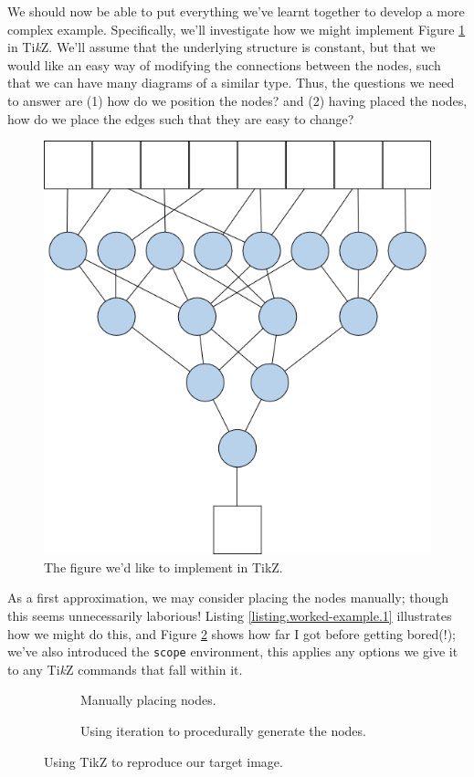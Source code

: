 We should now be able to put everything we've learnt together to develop a more complex example.
Specifically, we'll investigate how we might implement Figure \ref{figure.worked-example.specification} in Ti\emph{k}Z.
We'll assume that the underlying structure is constant, but that we would like an easy way of modifying the connections between the nodes, such that we can have many diagrams of a similar type.
Thus, the questions we need to answer are (1) how do we position the nodes? and (2) having placed the nodes, how do we place the edges such that they are easy to change?

\begin{figure}[btp]
	\centering
	\includegraphics[width=.25\textwidth]{figures/specification}
	\caption{The figure we'd like to implement in TikZ.}
	\label{figure.worked-example.specification}
\end{figure}

As a first approximation, we may consider placing the nodes manually; though this seems unnecessarily laborious!
Listing \ref{listing.worked-example.1} illustrates how we might do this, and Figure \ref{figure.worked-example.1} shows how far I got before getting bored(!); we've also introduced the \texttt{scope} environment, this applies any options we give it to any Ti\emph{k}Z commands that fall within it.


\begin{figure}[btp]
	\centering
	\begin{subfigure}{.45\textwidth}
		\centering
		
		\caption{Manually placing nodes.}
		\label{figure.worked-example.1}
	\end{subfigure}
	\begin{subfigure}{.45\textwidth}
		\centering
		
		\caption{Using iteration to procedurally generate the nodes.}
		\label{figure.worked-example.2}
	\end{subfigure}
	\caption{Using TikZ to reproduce our target image.}
\end{figure}



